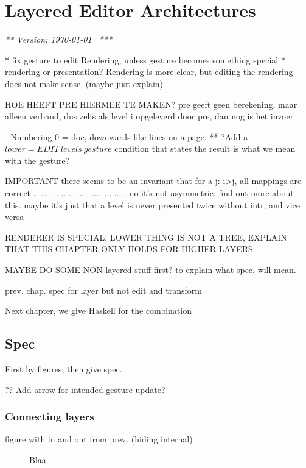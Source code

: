 \chapter{Layered Editor Architectures}
\label{chap:layeredArchs}
{\em *** Version: \today~ ***}



\bc
* fix gesture to edit Rendering, unless gesture becomes something special
* rendering or presentation? Rendering is more clear, but editing the rendering does not make sense. (maybe just explain)

HOE HEEFT PRE HIERMEE TE MAKEN? pre geeft geen berekening, maar alleen verband, dus zelfs als level i opgeleverd door pre, dan nog is het invoer

- Numbering 0 = doc, downwards like lines on a page.
** ?Add a $lower = EDIT~levels~gesture$ condition that states the result is what we mean with the gesture?



IMPORTANT there seems to be an invariant that for a j:  i>j, all mappings are correct 
  ..           ...       
 .  .    ..   .   .   .. 
.    ....  ...     ...  .
 no it's not asymmetric. find out more about this.
 maybe it's just that a level is never presented twice without intr, and vice versa

RENDERER IS SPECIAL, LOWER THING IS NOT A TREE, EXPLAIN THAT THIS CHAPTER ONLY HOLDS FOR HIGHER LAYERS


\ec
MAYBE DO SOME NON layered stuff first? to explain what spec. will mean.



prev. chap. spec for layer but not edit and transform

Next chapter, we give Haskell for the combination

\section{Spec}

First by figures, then give spec.


?? Add arrow for intended gesture update?

\subsection{Connecting layers}

figure with in and out from prev. (hiding internal)

\begin{figure}\begin{small}\begin{center}\begin{center}
\end{center}
\caption{Blaa}\label{singleToMulti} 
\end{center}\end{small}\end{figure}

